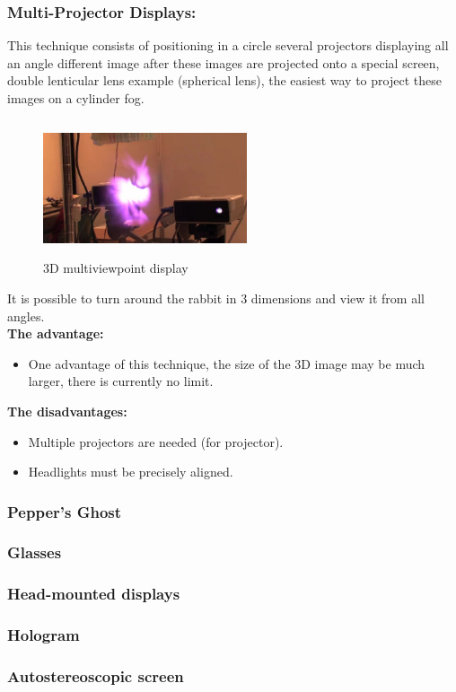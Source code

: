 \subsubsection{Multi-Projector Displays:}

This technique consists of positioning in a circle several projectors displaying all an angle different image after these images are projected onto a special screen, double lenticular lens example (spherical lens), the easiest way to project these images on a cylinder fog.

\begin{figure}[h!]
\begin{center}
\begin{minipage}{1\linewidth}
\centering\includegraphics[width=6cm,height=4cm]{image/lapin.png}
\caption{3D multiviewpoint display\cite{3Dmultiviewpoint}}
\end{minipage}
\end{center}
\end{figure}

It is possible to turn around the rabbit in 3 dimensions and view it from all angles.\\
\textbf{The advantage:} 

\begin{itemize}
\item One advantage of this technique, the size of the 3D image may be much larger, there is currently no limit.
\end{itemize}
\textbf{The disadvantages:}
\begin{itemize}
\item  Multiple projectors are needed (for projector).
\item Headlights must be precisely aligned.
\end{itemize}


\subsubsection{Pepper's Ghost}
\subsubsection{Glasses}
\subsubsection{Head-mounted displays}
\subsubsection{Hologram}
\subsubsection{Autostereoscopic screen}

